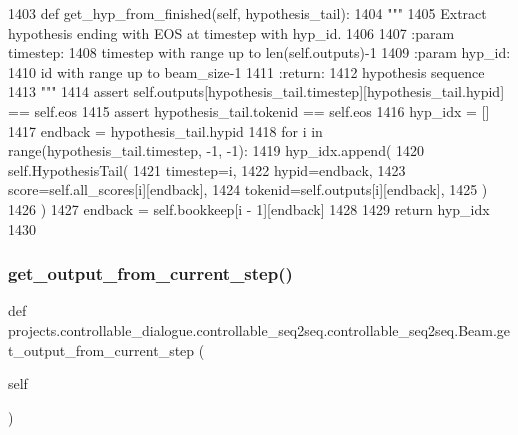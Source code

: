 \begin{DoxyCode}
1403     \textcolor{keyword}{def }get\_hyp\_from\_finished(self, hypothesis\_tail):
1404         \textcolor{stringliteral}{"""}
1405 \textcolor{stringliteral}{        Extract hypothesis ending with EOS at timestep with hyp\_id.}
1406 \textcolor{stringliteral}{}
1407 \textcolor{stringliteral}{        :param timestep:}
1408 \textcolor{stringliteral}{            timestep with range up to len(self.outputs)-1}
1409 \textcolor{stringliteral}{        :param hyp\_id:}
1410 \textcolor{stringliteral}{            id with range up to beam\_size-1}
1411 \textcolor{stringliteral}{        :return:}
1412 \textcolor{stringliteral}{            hypothesis sequence}
1413 \textcolor{stringliteral}{        """}
1414         \textcolor{keyword}{assert} self.outputs[hypothesis\_tail.timestep][hypothesis\_tail.hypid] == self.eos
1415         \textcolor{keyword}{assert} hypothesis\_tail.tokenid == self.eos
1416         hyp\_idx = []
1417         endback = hypothesis\_tail.hypid
1418         \textcolor{keywordflow}{for} i \textcolor{keywordflow}{in} range(hypothesis\_tail.timestep, -1, -1):
1419             hyp\_idx.append(
1420                 self.HypothesisTail(
1421                     timestep=i,
1422                     hypid=endback,
1423                     score=self.all\_scores[i][endback],
1424                     tokenid=self.outputs[i][endback],
1425                 )
1426             )
1427             endback = self.bookkeep[i - 1][endback]
1428 
1429         \textcolor{keywordflow}{return} hyp\_idx
1430 
\end{DoxyCode}
\mbox{\label{classprojects_1_1controllable__dialogue_1_1controllable__seq2seq_1_1controllable__seq2seq_1_1Beam_a2ed0d78713409a6ded788ece3d325b0c}} 
\subsubsection{\texorpdfstring{get\+\_\+output\+\_\+from\+\_\+current\+\_\+step()}{get\_output\_from\_current\_step()}}
{\footnotesize\ttfamily def projects.\+controllable\+\_\+dialogue.\+controllable\+\_\+seq2seq.\+controllable\+\_\+seq2seq.\+Beam.\+get\+\_\+output\+\_\+from\+\_\+current\+\_\+step (\begin{DoxyParamCaption}\item[{}]{self }\end{DoxyParamCaption})}

